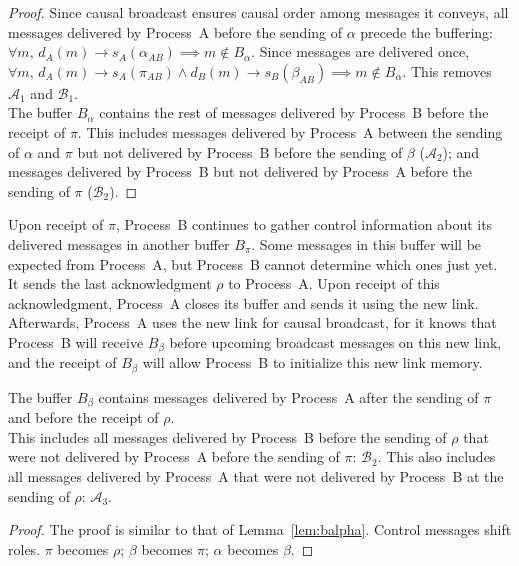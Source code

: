 \begin{proof}
  Since causal broadcast ensures causal order among messages it conveys, all
  messages delivered by Process~A before the sending of $\alpha$ precede the
  buffering:
  $\forall m,\, d_A(m) \rightarrow s_A(\alpha_{AB}) \implies m \not \in
  B_\alpha$.
  Since messages are delivered once,
  $\forall m,\, d_A(m) \rightarrow s_A(\pi_{AB}) \wedge d_B(m) \rightarrow
  s_B(\beta_{AB}) \implies m \not \in B_\alpha$.
  This removes $\mathcal{A}_1$ and $\mathcal{B}_1$.\\
  The buffer $B_\alpha$ contains the rest of messages delivered by Process~B
  before the receipt of $\pi$. This includes messages delivered by Process~A
  between the sending of $\alpha$ and $\pi$ but not delivered by Process~B
  before the sending of $\beta$ ($\mathcal{A}_2$); and messages delivered by
  Process~B but not delivered by Process~A before the sending of $\pi$
  ($\mathcal{B}_2$).
\end{proof}

\noindent Upon receipt of $\pi$, Process~B continues to gather control information about
its delivered messages in another buffer $B_\pi$. Some messages in this buffer
will be expected from Process~A, but Process~B cannot determine which ones just
yet. It sends the last acknowledgment $\rho$ to Process~A. Upon receipt of this
acknowledgment, Process~A closes its buffer and sends it using the new
link. Afterwards, Process~A uses the new link for causal broadcast, for it knows
that Process~B will receive $B_\beta$ before upcoming broadcast messages on this
new link, and the receipt of $B_\beta$ will allow Process~B to initialize this
new link memory.

\begin{lemma}
  The buffer $B_\beta$ contains messages delivered by Process~A after the
  sending of $\pi$ and before the receipt of $\rho$.\\
  This includes all messages delivered by Process~B before the sending of
  $\rho$ that were not delivered by Process~A before the sending of $\pi$:
  $\mathcal{B}_2$. This also includes all messages delivered by Process~A that
  were not delivered by Process~B at the sending of $\rho$: $\mathcal{A}_3$.
\end{lemma}
  
\begin{proof}
  The proof is similar to that of Lemma~\ref{lem:balpha}. Control messages
  shift roles. $\pi$ becomes $\rho$; $\beta$ becomes $\pi$; $\alpha$ becomes
  $\beta$.
\end{proof}

